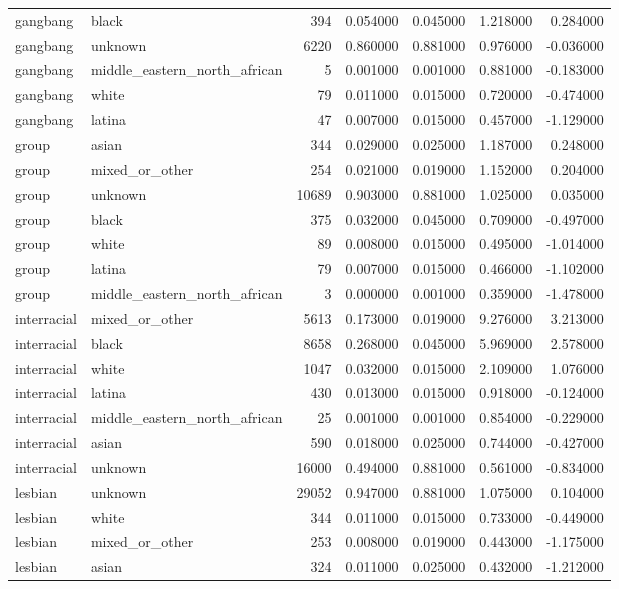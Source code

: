 \begin{tabular}{llrrrrr}
gangbang & black & 394 & 0.054000 & 0.045000 & 1.218000 & 0.284000 \\
gangbang & unknown & 6220 & 0.860000 & 0.881000 & 0.976000 & -0.036000 \\
gangbang & middle_eastern_north_african & 5 & 0.001000 & 0.001000 & 0.881000 & -0.183000 \\
gangbang & white & 79 & 0.011000 & 0.015000 & 0.720000 & -0.474000 \\
gangbang & latina & 47 & 0.007000 & 0.015000 & 0.457000 & -1.129000 \\
group & asian & 344 & 0.029000 & 0.025000 & 1.187000 & 0.248000 \\
group & mixed_or_other & 254 & 0.021000 & 0.019000 & 1.152000 & 0.204000 \\
group & unknown & 10689 & 0.903000 & 0.881000 & 1.025000 & 0.035000 \\
group & black & 375 & 0.032000 & 0.045000 & 0.709000 & -0.497000 \\
group & white & 89 & 0.008000 & 0.015000 & 0.495000 & -1.014000 \\
group & latina & 79 & 0.007000 & 0.015000 & 0.466000 & -1.102000 \\
group & middle_eastern_north_african & 3 & 0.000000 & 0.001000 & 0.359000 & -1.478000 \\
interracial & mixed_or_other & 5613 & 0.173000 & 0.019000 & 9.276000 & 3.213000 \\
interracial & black & 8658 & 0.268000 & 0.045000 & 5.969000 & 2.578000 \\
interracial & white & 1047 & 0.032000 & 0.015000 & 2.109000 & 1.076000 \\
interracial & latina & 430 & 0.013000 & 0.015000 & 0.918000 & -0.124000 \\
interracial & middle_eastern_north_african & 25 & 0.001000 & 0.001000 & 0.854000 & -0.229000 \\
interracial & asian & 590 & 0.018000 & 0.025000 & 0.744000 & -0.427000 \\
interracial & unknown & 16000 & 0.494000 & 0.881000 & 0.561000 & -0.834000 \\
lesbian & unknown & 29052 & 0.947000 & 0.881000 & 1.075000 & 0.104000 \\
lesbian & white & 344 & 0.011000 & 0.015000 & 0.733000 & -0.449000 \\
lesbian & mixed_or_other & 253 & 0.008000 & 0.019000 & 0.443000 & -1.175000 \\
lesbian & asian & 324 & 0.011000 & 0.025000 & 0.432000 & -1.212000 \\

\end{tabular}
